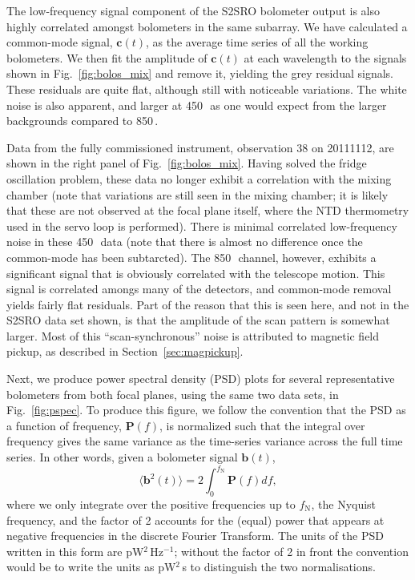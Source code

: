 \documentclass[useAMS,usenatbib,nofootinbib]{mn2e}
\begin{document}
The low-frequency signal component of the S2SRO bolometer output is
also highly correlated amongst bolometers in the same subarray. We
have calculated a common-mode signal, $\mathbf{c}(t)$, as the average
time series of all the working bolometers. We then fit the amplitude
of $\mathbf{c}(t)$ at each wavelength to the signals shown in
Fig.~\ref{fig:bolos_mix} and remove it, yielding the grey residual
signals. These residuals are quite flat, although still with
noticeable variations. The white noise is also apparent, and larger at
450\,\micron\ as one would expect from the larger backgrounds compared
to 850\,\micron.

Data from the fully commissioned instrument, observation 38 on
20111112, are shown in the right panel of
Fig.~\ref{fig:bolos_mix}. Having solved the fridge oscillation
problem, these data no longer exhibit a correlation with the mixing
chamber (note that variations are still seen in the mixing chamber; it
is likely that these are not observed at the focal plane itself, where
the NTD thermometry used in the servo loop is performed). There is
minimal correlated low-frequency noise in these 450\,\micron\ data
(note that there is almost no difference once the common-mode has been
subtarcted). The 850\,\micron\ channel, however, exhibits a
significant signal that is obviously correlated with the telescope
motion. This signal is correlated amongs many of the detectors, and
common-mode removal yields fairly flat residuals. Part of the reason
that this is seen here, and not in the S2SRO data set shown, is that
the amplitude of the scan pattern is somewhat larger. Most of this
``scan-synchronous'' noise is attributed to magnetic field pickup, as
described in Section~\ref{sec:magpickup}.

Next, we produce power spectral density (PSD) plots for several
representative bolometers from both focal planes, using the same two
data sets, in Fig.~\ref{fig:pspec}. To produce this figure, we follow
the convention that the PSD as a function of frequency,
$\mathbf{P}(f)$, is normalized such that the integral over frequency
gives the same variance as the time-series variance across the full
time series. In other words, given a bolometer signal $\mathbf{b}(t)$,
%
\begin{equation}
\label{eq:psd}
\langle\mathbf{b}^2(t)\rangle = 2 \int_0^{f_\mathrm{N}} \mathbf{P}(f)
df ,
\end{equation}
%
where we only integrate over the positive frequencies up to
$f_\mathrm{N}$, the Nyquist frequency, and the factor of 2 accounts
for the (equal) power that appears at negative frequencies in the
discrete Fourier Transform. The units of the PSD written in this form
are pW$^2$\,Hz$^{-1}$; without the factor of 2 in front the convention
would be to write the units as pW$^2$\,s to distinguish the two
normalisations.
\end{document}
